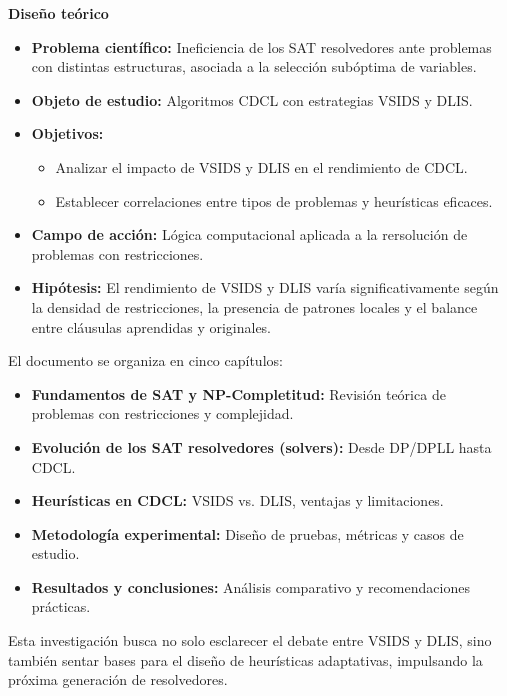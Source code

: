 \textbf{Diseño teórico}
\begin{itemize}
    \item \textbf{Problema científico:} Ineficiencia de los SAT resolvedores ante problemas con distintas estructuras, asociada a la selección subóptima de variables.
    \item \textbf{Objeto de estudio:} Algoritmos CDCL con estrategias VSIDS y DLIS.
    \item \textbf{Objetivos:}
    \begin{itemize}
        \item Analizar el impacto de VSIDS y DLIS en el rendimiento de CDCL.
        \item Establecer correlaciones entre tipos de problemas y heurísticas eficaces.
    \end{itemize}
    \item \textbf{Campo de acción:} Lógica computacional aplicada a la rersolución de problemas con restricciones.
    \item \textbf{Hipótesis:} El rendimiento de VSIDS y DLIS varía significativamente según la densidad de restricciones, la presencia de patrones locales y el balance entre cláusulas aprendidas y originales.
\end{itemize}

El documento se organiza en cinco capítulos:
\begin{itemize}
    \item \textbf{Fundamentos de SAT y NP-Completitud:} Revisión teórica de problemas con restricciones y complejidad.
    \item \textbf{Evolución de los SAT resolvedores (solvers):} Desde DP/DPLL hasta CDCL.
    \item \textbf{Heurísticas en CDCL:} VSIDS vs. DLIS, ventajas y limitaciones.
    \item \textbf{Metodología experimental:} Diseño de pruebas, métricas y casos de estudio.
    \item \textbf{Resultados y conclusiones:} Análisis comparativo y recomendaciones prácticas.
\end{itemize}

Esta investigación busca no solo esclarecer el debate entre VSIDS y DLIS, sino también sentar bases para el diseño de heurísticas adaptativas, impulsando la próxima generación de resolvedores.
